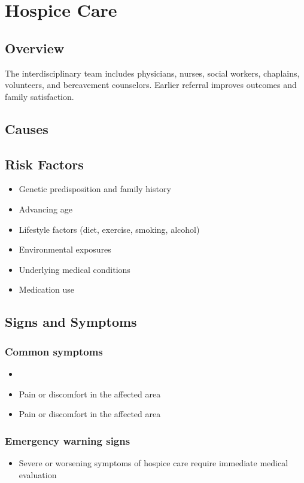 \chapter{Hospice Care}
\label{sec:Hospice Care}

\section{Overview}
The interdisciplinary team includes physicians, nurses, social workers, chaplains, volunteers, and bereavement counselors. Earlier referral improves outcomes and family satisfaction.
\section{Causes}
\section{Risk Factors}

\begin{itemize}[noitemsep]
  \item Genetic predisposition and family history
  \item Advancing age
  \item Lifestyle factors (diet, exercise, smoking, alcohol)
  \item Environmental exposures
  \item Underlying medical conditions
  \item Medication use
\end{itemize}
\section{Signs and Symptoms}

\subsection{Common symptoms}
\begin{itemize}[noitemsep]
  \item \item Pain or discomfort in the affected area    \item Pain or discomfort in the affected area
  \end{itemize}

\subsection{Emergency warning signs}
\begin{itemize}[noitemsep]
  \item Severe or worsening symptoms of hospice care require immediate medical evaluation
\end{itemize}
